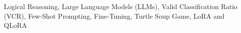 \documentclass[conference]{IEEEtran}
\begin{document}
\begin{IEEEkeywords}
Logical Reasoning, Large Language Models (LLMs), Valid Classification Ratio (VCR), Few-Shot Prompting, Fine-Tuning, Turtle Soup Game, LoRA and QLoRA
\end{IEEEkeywords}
















\end{document}
